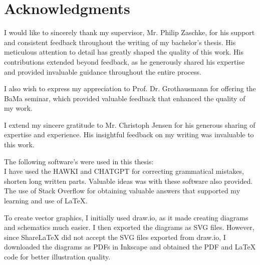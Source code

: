 \section{Acknowledgments}

I would like to sincerely thank my supervisor, Mr. Philip Zaschke, for his support and consistent feedback throughout the writing of my bachelor's thesis. His meticulous attention to detail has greatly shaped the quality of this work. His contributions extended beyond feedback, as he generously shared his expertise and provided invaluable guidance throughout the entire process.

I also wish to express my appreciation to Prof. Dr. Grothausmann for offering the BaMa seminar, which provided valuable feedback that enhanced the quality of my work.

I extend my sincere gratitude to Mr. Christoph Jensen for his generous sharing of expertise and experience. His insightful feedback on my writing was invaluable to this work.


The following software's were used in this thesis: \\ 
I have used the HAWKI and CHATGPT for correcting grammatical mistakes, shorten long written parts. Valuable ideas was with these software also provided.
The use of Stack Overflow for obtaining valuable answers that supported my learning and use of LaTeX.

To create vector graphics, I initially used draw.io, as it made creating diagrams and schematics much easier. I then exported the diagrams as SVG files. However, since ShareLaTeX did not accept the SVG files exported from draw.io, I downloaded the diagrams as PDFs in Inkscape and obtained the PDF and LaTeX code for better illustration quality.









